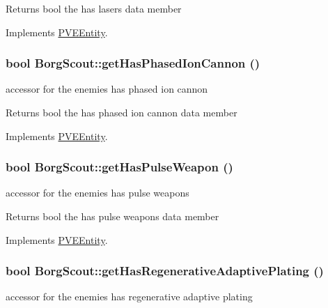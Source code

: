 \begin{DoxyReturn}{Returns}
bool the has lasers data member 
\end{DoxyReturn}


Implements \hyperlink{classPVEEntity}{PVEEntity}.

\hypertarget{classBorgScout_a1ee127e8654d327c6ee34b5077c8ea1d}{
\subsubsection[{getHasPhasedIonCannon}]{\setlength{\rightskip}{0pt plus 5cm}bool BorgScout::getHasPhasedIonCannon ()}}
\label{d5/d8c/classBorgScout_a1ee127e8654d327c6ee34b5077c8ea1d}
accessor for the enemies has phased ion cannon

\begin{DoxyReturn}{Returns}
bool the has phased ion cannon data member 
\end{DoxyReturn}


Implements \hyperlink{classPVEEntity}{PVEEntity}.

\hypertarget{classBorgScout_a4a2dda4639a9f5f53d673cf82d7ff416}{
\subsubsection[{getHasPulseWeapon}]{\setlength{\rightskip}{0pt plus 5cm}bool BorgScout::getHasPulseWeapon ()}}
\label{d5/d8c/classBorgScout_a4a2dda4639a9f5f53d673cf82d7ff416}
accessor for the enemies has pulse weapons

\begin{DoxyReturn}{Returns}
bool the has pulse weapons data member 
\end{DoxyReturn}


Implements \hyperlink{classPVEEntity}{PVEEntity}.

\hypertarget{classBorgScout_a13a50a9d314581a10f232cee3612ce55}{
\subsubsection[{getHasRegenerativeAdaptivePlating}]{\setlength{\rightskip}{0pt plus 5cm}bool BorgScout::getHasRegenerativeAdaptivePlating ()}}
\label{d5/d8c/classBorgScout_a13a50a9d314581a10f232cee3612ce55}
accessor for the enemies has regenerative adaptive plating

